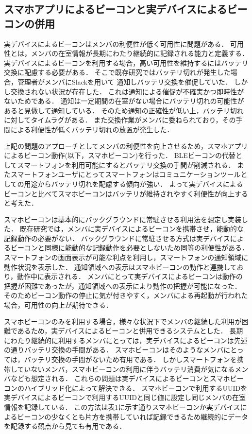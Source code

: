 
\subsection{スマホアプリによるビーコンと実デバイスによるビーコンの併用}


実デバイスによるビーコンはメンバの利便性が低く可用性に問題がある．
可用性とは，メンバの在室情報が長期にわたり継続的に記録される能力と定義する．
実デバイスによるビーコンを利用する場合，高い可用性を維持するにはバッテリ交換に配慮する必要がある．
そこで既存研究ではバッテリ切れが発生した場合，管理者がメンバにSlackを用いて
通知しバッテリ交換を催促していた．
しかし交換されない状況が存在した．
これは通知による催促が不確実かつ即時性がないためである．
通知は一定期間の在室がない場合にバッテリ切れの可能性があると見做して通知している．
そのため通知の正確性が低い上，バッテリ切れに対してタイムラグがある．
また交換作業がメンバに委ねられており，その手間による利便性が低くバッテリ切れの放置が発生した．


上記の問題のアプローチとしてメンバの利便性を向上させるため，スマホアプリによるビーコン動作(以下，スマホビーコン)を行った．
BLEビーコンの代替としてスマートフォンを利用可能にするとバッテリ交換の手間が削減される．
またスマートフォンユーザにとってスマートフォンはコミュニケーションツールとしての用途からバッテリ切れを配慮する傾向が強い．
よって実デバイスによるビーコンと比べてスマホビーコンはバッテリが維持されやすく利便性が向上すると考えた．

スマホビーコンは基本的にバックグラウンドに常駐させる利用法を想定し実装した．
既存研究では，メンバに実デバイスによるビーコンを携帯させ，能動的な記録動作の必要がない．
バックグラウンドに常駐させる方式は実デバイスによるビーコンと同様に能動的な記録動作を必要としないため同等の利便性がある．
スマートフォンの画面表示が可能な利点を利用し，スマートフォンの通知領域に動作状況を表示した．
通知領域への表示はスマホビーコンの動作と連携しており，動作中に表示される．
メンバにとって実デバイスによるビーコンは動作の把握が困難であったが，通知領域への表示により動作の把握が可能になった．
そのためビーコン動作の停止に気が付きやすく，メンバによる再起動が行われた場合，可用性の向上が期待できる．



スマホビーコンのみを利用する場合，様々な状況下でメンバの継続した利用が困難であるため，実デバイスによるビーコンと併用できるシステムとした．
長期にわたり継続的に利用するメンバにとっては，実デバイスによるビーコンは先述の通りバッテリ交換の手間がある．
スマホビーコンはそのようなメンバにとっては，バッテリ交換の手間がないため有用である．
しかしスマートフォンを携帯していないメンバ，スマホビーコンの利用に伴うバッテリ消費が気になるメンバなども想定される．
これらの問題は実デバイスによるビーコンとスマホビーコンのハイブリッド化によって解決できる．
スマホビーコンで利用するUUIDを実デバイスによるビーコンで利用するUUIDと同じ値に設定し同じメンバの在室情報を記録している．
この方法は表1に示す通りスマホビーコンか実デバイスによるビーコンの少なくとも片方を携帯していれば記録できるため継続的にデータを記録する観点から見ても有用である．

